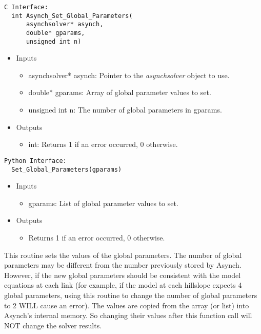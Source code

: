 \documentclass[12pt]{article}
\begin{document}
\begin{lstlisting}[style=CStyle]
  C Interface:
  int Asynch_Set_Global_Parameters(
      asynchsolver* asynch,
      double* gparams,
      unsigned int n)
\end{lstlisting}
\begin{itemize}
 \item Inputs
  \begin{itemize}
   \item asynchsolver* asynch: Pointer to the \emph{asynchsolver} object to use.
   \item double* gparams: Array of global parameter values to set.
   \item unsigned int n: The number of global parameters in gparams.
  \end{itemize}
 \item Outputs
  \begin{itemize}
   \item int: Returns 1 if an error occurred, 0 otherwise.
  \end{itemize}
\end{itemize}
\begin{lstlisting}[style=PythonStyle]
  Python Interface:
  Set_Global_Parameters(gparams)
\end{lstlisting}
\begin{itemize}
 \item Inputs
  \begin{itemize}
   \item gparams: List of global parameter values to set.
  \end{itemize}
 \item Outputs
  \begin{itemize}
   \item Returns 1 if an error occurred, 0 otherwise.
  \end{itemize}
\end{itemize}
This routine sets the values of the global parameters. The number of global parameters may be different from the number previously stored by Asynch. However, if the new global parameters should be consistent with the model equations at each link (for example, if the model at each hillslope expects 4 global parameters, using this routine to change the number of global parameters to 2 WILL cause an error). The values are copied from the array (or list) into Asynch's internal memory. So changing their values after this function call will NOT change the solver results.
\end{document}
